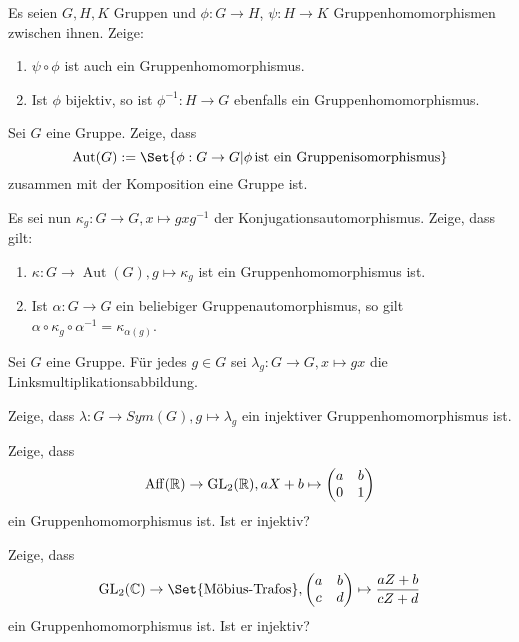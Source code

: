\begin{sheet}
\begin{problem}
Es seien $G,H,K$ Gruppen und $\phi: G\to H$, $\psi: H\to K$ Gruppenhomomorphismen zwischen ihnen. Zeige:

\begin{enumerate}
\item $\psi\circ\phi$ ist auch ein Gruppenhomomorphismus.
\item Ist $\phi$ bijektiv, so ist $\phi^{-1}:H\to G$ ebenfalls ein Gruppenhomomorphismus.
\end{enumerate}
\end{problem}

\begin{problem}
Sei $G$ eine Gruppe. Zeige, dass
\[\operatorname{Aut}(G) := \Set{\phi: G\to G | \phi\,\text{ist ein Gruppenisomorphismus}}\]
zusammen mit der Komposition eine Gruppe ist.

Es sei nun $\kappa_g: G\to G, x\mapsto gxg^{-1}$ der Konjugationsautomorphismus. Zeige, dass gilt:
\begin{enumerate}
\item $\kappa: G\to\operatorname{Aut}(G), g\mapsto\kappa_g$ ist ein Gruppenhomomorphismus ist.
\item Ist $\alpha: G\to G$ ein beliebiger Gruppenautomorphismus, so gilt $\alpha\circ\kappa_g\circ\alpha^{-1} = \kappa_{\alpha(g)}$.
\end{enumerate}
\end{problem}

\begin{problem}[title={Cayley-Einbettung; \enquote{Jede Gruppe ist eine Permutationsgruppe}}]
Sei $G$ eine Gruppe. Für jedes $g\in G$ sei $\lambda_g: G\to G, x\mapsto gx$ die Linksmultiplikationsabbildung.

Zeige, dass $\lambda: G\to Sym(G), g\mapsto\lambda_g$ ein injektiver Gruppenhomomorphismus ist.
\end{problem}

\begin{problem}
Zeige, dass
\[\operatorname{Aff}(\mathbb{R})\to\operatorname{GL}_2(\mathbb{R}), aX+b \mapsto \begin{pmatrix} a & b \\ 0 & 1 \end{pmatrix}\]
ein Gruppenhomomorphismus ist. Ist er injektiv?
\end{problem}

\begin{problem}
Zeige, dass
\[\operatorname{GL}_2(\IC)\to \Set{\text{Möbius-Trafos}}, \begin{pmatrix} a & b \\ c & d \end{pmatrix} \mapsto \frac{aZ+b}{cZ+d}\]
ein Gruppenhomomorphismus ist. Ist er injektiv?
\end{problem}


\end{sheet}
